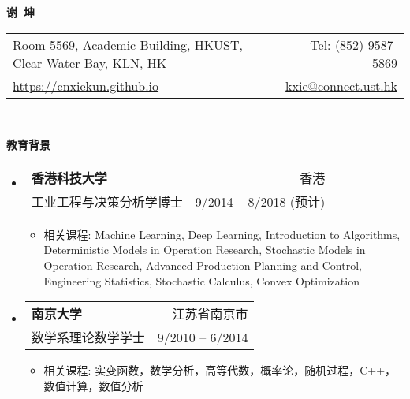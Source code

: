 \documentclass[letterpaper,9pt]{ctexart}
\makeatletter
\newcommand{\resitem}[1]{\item #1 \vspace{-2pt}}
\newcommand{\resheading}[1]{{\large \colorbox{mygrey}{\begin{minipage}{\textwidth}{\textbf{#1 \vphantom{p\^{E}}}}\end{minipage}}}}
\newcommand{\ressubheading}[4]{
\begin{tabular*}{6.5in}{l@{\extracolsep{\fill}}r}
    \textbf{#1} & #2 \\
    #3 & #4 \\
\end{tabular*}\vspace{-6pt}}
\makeatother
\begin{document}


\newcommand{\mywebheader}{
\begin{tabular*}{\linewidth}{l@{\extracolsep{\fill}}r}
    {\large Room 5569, Academic Building, HKUST, Clear Water Bay, KLN, HK} & {\large Tel: (852) 9587-5869} \\
    {\large \href{https://cnxiekun.github.io}{https://cnxiekun.github.io}} & {\large \href{mailto:kxie@connect.ust.hk}{kxie@connect.ust.hk}}
\end{tabular*}
\\
\vspace{0.15in}}

\begin{center}
    \textbf{{\huge 谢~坤}}
\end{center}

\vspace{0.1in}

\mywebheader
\quad


\resheading{教育背景}
\begin{itemize}
\item \ressubheading{香港科技大学}{香港}{工业工程与决策分析学博士}{9/2014 -- 8/2018 (预计)}

\begin{itemize}
\resitem{相关课程: Machine Learning, Deep Learning, Introduction to Algorithms, Deterministic Models in Operation Research, Stochastic Models in Operation Research, Advanced Production Planning and Control, Engineering Statistics, Stochastic Calculus, Convex Optimization}
\end{itemize}

\item \ressubheading{南京大学}{江苏省南京市}{数学系理论数学学士}{9/2010 -- 6/2014}

\begin{itemize}
\resitem{相关课程: 实变函数，数学分析，高等代数，概率论，随机过程，C++，数值计算，数值分析}
\end{itemize}

\end{itemize}
\end{document}
